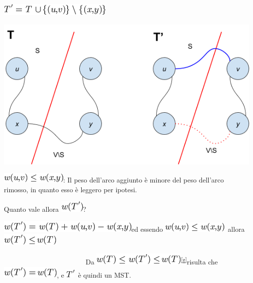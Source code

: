 \documentclass{article}
\begin{document}
\includegraphics{images/image456.png}

{}

{\includegraphics{images/image530.png}}

{}

{}

\includegraphics{images/image457.png}{: Il peso dell'arco aggiunto è
minore del peso dell'arco rimosso, in quanto esso è leggero per
ipotesi.}

{}

{Quanto vale allora }\includegraphics{images/image458.png}{? }

\includegraphics{images/image459.png}{ed essendo
}\includegraphics{images/image457.png}{~allora
}\includegraphics{images/image460.png}

{}

{~~~~~~~~~~~~~~~~~~~~~~~~}{Da
}\includegraphics{images/image461.png}\textsuperscript{\protect\hyperlink{cmnt26}{{[}z{]}}}{risulta
che }\includegraphics{images/image462.png}{, e
}\includegraphics{images/image463.png}{~è quindi un MST.}
\end{document}
